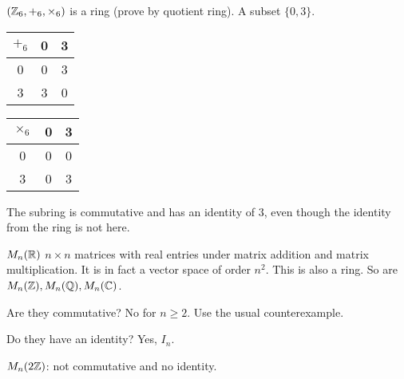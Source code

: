 \documentclass[class=article,crop=false]{standalone}
\begin{document}
\begin{eg}[]
	$ (\mathbb{Z}_6, +_{ 6},\times _6 )$ is a ring (prove by quotient ring). A subset $ \{0,3\} $. 
	\begin{table}[H]
		\centering
		\begin{tabular}{c|c|c}
			$ +_{ 6} $ & 0&3\\
			\hline
			0&0&3\\
			\hline
			3&3&0
		\end{tabular}
	\end{table}
	\begin{table}[H]
		\centering
		\begin{tabular}{c|c|c}
		 $ \times _6$ &0  &3\\
		 \hline
		 0&0&0\\
		 \hline
		 3&0&3
		\end{tabular}
	\end{table}
	The subring is commutative and has an identity of $ 3$, even though the identity from the ring is not here.
\end{eg}
\begin{eg}[]
	$ M_n( \mathbb{R})$ $ n \times n$ matrices with real entries under matrix addition and matrix multiplication. It is in fact a vector space of order $ n^2$. This is also a ring. So are $ M_n( \mathbb{Z}), M_n( \mathbb{Q}), M_n( \mathbb{C})$. 

	Are they commutative? No for $ n\geq 2$. Use the usual counterexample.

	Do they have an identity? Yes, $ I_n$.

	\begin{note}[]
		$ M_n(2 \mathbb{Z})$: not commutative and no identity.
	\end{note}
\end{eg}
\end{document}

